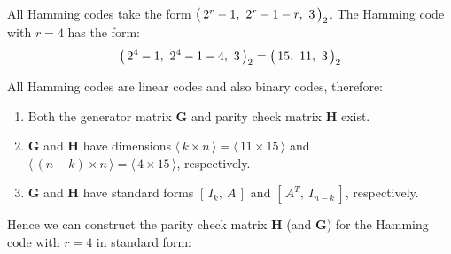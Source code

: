 \documentclass{AssignmentCUNY}
\begin{document}
%

All Hamming codes take the form $\boldsymbol{\bigl(\bigr.}\,2^{r} - 1,~2^{r} - 1 - r,~3\,\boldsymbol{\bigl.\bigr)}_{2}$.
The Hamming code with $r=4$ has the form:
\[ \boldsymbol{\bigl(\bigr.}\,2^{4} - 1,~2^{4} - 1 - 4,~3\,\boldsymbol{\bigl.\bigr)}_{2} = \boldsymbol{\bigl(\bigr.}\,15,~11,~3\,\boldsymbol{\bigl.\bigr)}_{2} \]

All Hamming codes are linear codes and also binary codes, therefore:

\begin{enumerate}

	\item Both the generator matrix $\mathbf{G}$ and parity check matrix $\mathbf{H}$ exist.

	\item $\mathbf{G}$ and $\mathbf{H}$ have dimensions $\langle\, k \times n \,\rangle = \langle\, 11 \times 15 \,\rangle$ and $\langle\, (n - k) \times n \,\rangle = \langle\, 4 \times 15 \,\rangle$, respectively.
	
	\item $\mathbf{G}$ and $\mathbf{H}$ have standard forms $\left[\,I_k,\:A\,\right]$ and $\left[\,A^{T},\:I_{n-k}\,\right]$, respectively.

\end{enumerate}

Hence we can construct the parity check matrix $\mathbf{H}$ (and $\mathbf{G}$) for the Hamming code with $r=4$ in standard form:
\end{document}
